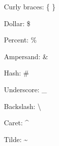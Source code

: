 \documentclass[a4paper,12pt]{article}
\begin{document}
Curly braces: \{ \}

Dollar: \$

Percent: \%

Ampersand: \&

Hash: \#

Underscore: \_

Backslash: \textbackslash

Caret: \textasciicircum

Tilde: \textasciitilde
\end{document}
